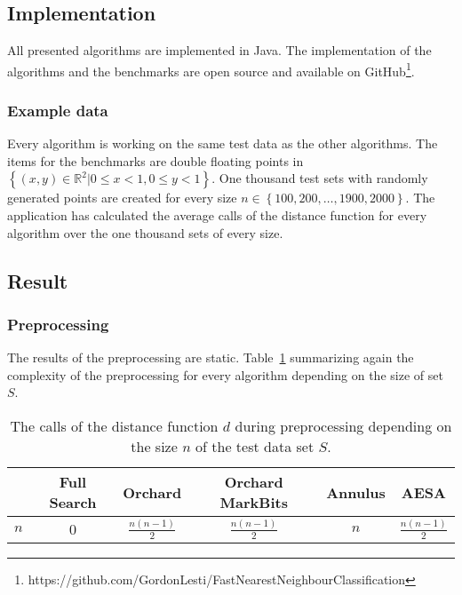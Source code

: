 \documentclass[runningheads,a4paper]{llncs}
\begin{document}
\subsection{Implementation}
All presented algorithms are implemented in Java. The implementation of the algorithms and the benchmarks are open
source and available on GitHub\footnote{https://github.com/GordonLesti/FastNearestNeighbourClassification}.

\subsubsection{Example data}

Every algorithm is working on the same test data as the other algorithms. The items for the benchmarks are double
floating points in $\left\{ {(x, y) \in \mathbb{R}^2|0 \leq x < 1, 0 \leq y < 1}\right\}$. One thousand test sets with
randomly generated points are created for every size $n \in \left\{ {100, 200, \dots, 1900, 2000}\right\}$. The
application has calculated the average calls of the distance function for every algorithm over the one thousand sets of
every size.

\subsection{Result}

\subsubsection{Preprocessing}

The results of the preprocessing are static. Table~\ref{tab:preprocessing} summarizing again the complexity of the
preprocessing for every algorithm depending on the size of set $S$.

\setlength{\tabcolsep}{6pt}

\begin{table}[H]
	\begin{center}{\tiny
		\begin{tabular}{| l | c | c | c | c | c |}
			\hline
		  	& Full Search & Orchard & Orchard MarkBits & Annulus & AESA \\ \hline
		  	$n$ & 0 & $\frac{n(n-1)}{2}$ & $\frac{n(n-1)}{2}$ & $n$ & $\frac{n(n-1)}{2}$ \\ \hline
		\end{tabular}}
	\end{center}
	\caption{The calls of the distance function $d$ during preprocessing depending on the size $n$ of the test data set
		$S$.}
	\label{tab:preprocessing}
\end{table}
\end{document}
